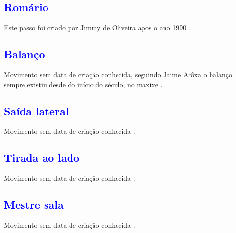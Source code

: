 \subsection{\textcolor{blue}{Romário}}
\label{subsec:passo:romario}
Este passo foi criado por Jimmy de Oliveira apos o ano 1990 \cite{sambafunkeadoJimmyDeOliveiraPart1}.





\subsection{\textcolor{blue}{Balanço}}
Movimento sem data de criação conhecida, 
seguindo Jaime Arôxa o balanço sempre existiu desde do início do século, 
no maxixe \cite{EntrevistaJaimeAroxa1} \cite[pp. 144]{perna2002samba}.


\subsection{\textcolor{blue}{Saída lateral}}
Movimento sem data de criação conhecida \cite[pp. 144]{perna2002samba}.

\subsection{\textcolor{blue}{Tirada ao lado}}
Movimento sem data de criação conhecida \cite[pp. 144]{perna2002samba}.

\subsection{\textcolor{blue}{Mestre sala}}
Movimento sem data de criação conhecida \cite[pp. 144]{perna2002samba}.




